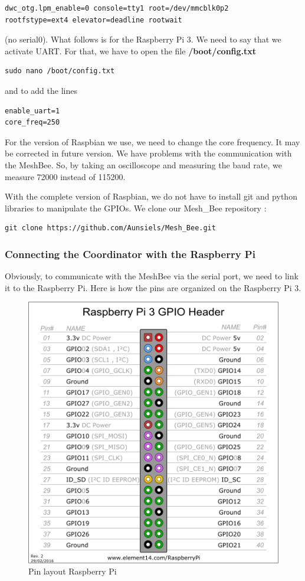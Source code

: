 \begin{lstlisting}[frame=single]
dwc_otg.lpm_enable=0 console=tty1 root=/dev/mmcblk0p2
rootfstype=ext4 elevator=deadline rootwait
\end{lstlisting}

(no serial0). What follows is for the Raspberry Pi 3. We need to say that we activate UART. For that, we have to open the file \textbf{/boot/config.txt}

\begin{lstlisting}[frame=single]
sudo nano /boot/config.txt
\end{lstlisting}

and to add the lines

\begin{lstlisting}[frame=single]
enable_uart=1
core_freq=250
\end{lstlisting}

For the version of Raspbian we use, we need to change the core frequency. It may be corrected in future version. We have problems with the communication with the MeshBee. So, by taking an oscilloscope and measuring the baud rate, we measure 72000 instead of  115200.

With the complete version of Raspbian, we do not have to install git and python libraries to manipulate the GPIOs. We clone our Mesh\_Bee repository :

\begin{lstlisting}[frame=single]
git clone https://github.com/Aunsiels/Mesh_Bee.git
\end{lstlisting}

\subsubsection{Connecting the Coordinator with the Raspberry Pi}

Obviously, to communicate with the MeshBee via the serial port, we need to link it to the Raspberry Pi. Here is how the pins are organized on the Raspberry Pi 3.

\begin{figure}[ht]
\centering
\includegraphics[width=.6\linewidth]{pi3_gpio}
\caption[Pin layout Raspberry Pi]{\label{f:pi3_gpio}Pin layout Raspberry Pi}
\end{figure}

